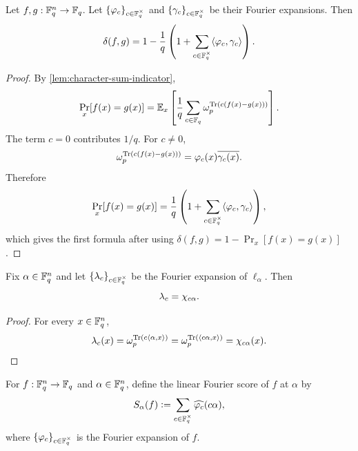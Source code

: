 \begin{lemma}
\label{lem:distance-formula}
\leanok
Let $f,g:{\mathbb F}_q^n\to{\mathbb F}_q$.
Let $\{{\varphi}_{c}\}_{c\in{\mathbb F}_q^\times}$ and
$\{{\gamma}_{c}\}_{c\in{\mathbb F}_q^\times}$ be their Fourier expansions.
Then
\[
    \delta(f,g)
    = 1-\frac{1}{q}\left(1+
        \sum_{c\in{\mathbb F}_q^\times}
        \langle {\varphi}_{c}, {\gamma}_{c} \rangle
    \right).
\]
\end{lemma}

\begin{proof}\leanok
By \cref{lem:character-sum-indicator},
\[
    \Pr_x[f(x)=g(x)]
    = {\mathbb E}_x\left[\frac{1}{q}\sum_{c\in{\mathbb F}_q}
        \omega_p^{{\rm Tr}(c(f(x)-g(x)))}\right].
\]
The term $c=0$ contributes $1/q$. For $c\ne 0$,
\[
    \omega_p^{{\rm Tr}(c(f(x)-g(x)))}
    = {\varphi}_{c}(x)\overline{{\gamma}_{c}(x)}.
\]
Therefore
\[
    \Pr_x[f(x)=g(x)]
    =\frac{1}{q}\left(1+\sum_{c\in{\mathbb F}_q^\times}
        \langle {\varphi}_{c}, {\gamma}_{c} \rangle
    \right),
\]
which gives the first formula after using
$\delta(f,g)=1-\Pr_x[f(x)=g(x)]$.
\end{proof}

\begin{lemma}
\label{lem:linear-function-fourier-expansion}
\leanok
Fix $\alpha\in{\mathbb F}_q^n$ and let $\{\lambda_c\}_{c \in {\mathbb F}_q^\times}$ be the Fourier expansion of $\ell_\alpha$.
Then
\[
    \lambda_{c}=\chi_{c\alpha}.
\]
\end{lemma}

\begin{proof}\leanok
For every $x\in{\mathbb F}_q^n$,
\[
    \lambda_{c}(x)
    = \omega_p^{{\rm Tr}(c\langle \alpha, x \rangle)}
    = \omega_p^{{\rm Tr}(\langle c\alpha, x \rangle)}
    = \chi_{c\alpha}(x).
\]
\end{proof}

\begin{definition}
\label{def:linear-fourier-score}
\leanok
For $f:{\mathbb F}_q^n\to{\mathbb F}_q$ and $\alpha\in{\mathbb F}_q^n$, define the linear Fourier score
of $f$ at $\alpha$ by
\[
    S_\alpha(f) \mathrel{\mathop:}= \sum_{c\in{\mathbb F}_q^\times}
        \widehat{{\varphi}_{c}}(c\alpha),
\]
where $\{{\varphi}_{c}\}_{c \in {\mathbb F}_q^\times}$ is the Fourier expansion of $f$.
\end{definition}


